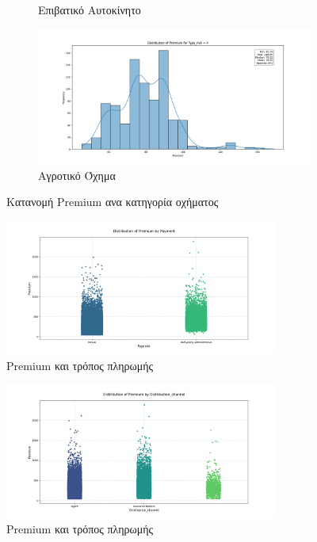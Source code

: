 \documentclass{llncs}
\begin{document}
\begin{figure}[h!]
\begin{subfigure}{0.45\linewidth}
       \caption{Επιβατικό Αυτοκίνητο}
       \label{fig:subfig3}
        \end{subfigure}
         \begin{subfigure}{0.45\linewidth}
        \includegraphics[width=\linewidth]{images/premium_risk4.png}
        \caption{Αγροτικό Όχημα}
        \label{fig:subfig4}
         \end{subfigure}
  \caption{Κατανομή Premium ανα κατηγορία οχήματος}
  \label{fig:subfigures4}
\end{figure}

\begin{figure}[h!]
    \begin{center}
        \includegraphics[width=0.8\textwidth]{images/PaymentAll.png}
    \end{center}
    \caption{Premium και τρόπος πληρωμής} 
    \label{fig:premium_payment}   
\end{figure}

\begin{figure}[h!]
    \begin{center}
        \includegraphics[width=0.8\textwidth]{images/distributionAll.png}
    \end{center}
    \caption{Premium και τρόπος πληρωμής} 
    \label{fig:premium_distribution_channel}   
\end{figure}
\end{document}

